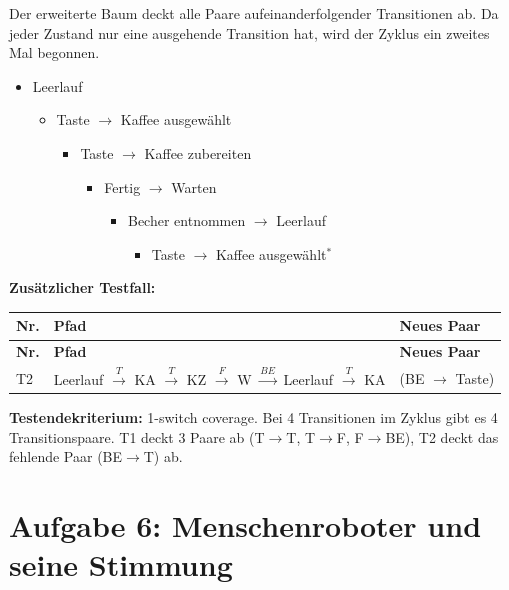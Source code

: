 \documentclass[
	fontsize=12pt,          %
	paper=a4,               %
	numbers=noenddot,       %
	listof=totoc,           %
	listof=entryprefix,     %
	listof=nochaptergap,    %
	bibliography=totoc,     %
	parskip=half,           %
	openany                 %
]{scrbook}
\begin{document}
Der erweiterte Baum deckt alle Paare aufeinanderfolgender Transitionen ab.
Da jeder Zustand nur eine ausgehende Transition hat, wird der Zyklus ein zweites Mal begonnen.

\begin{itemize}
	\item Leerlauf
	\begin{itemize}
		\item Taste $\rightarrow$ Kaffee ausgewählt
		\begin{itemize}
			\item Taste $\rightarrow$ Kaffee zubereiten
			\begin{itemize}
				\item Fertig $\rightarrow$ Warten
				\begin{itemize}
					\item Becher entnommen $\rightarrow$ Leerlauf
					\begin{itemize}
						\item Taste $\rightarrow$ Kaffee ausgewählt$^*$
					\end{itemize}
				\end{itemize}
			\end{itemize}
		\end{itemize}
	\end{itemize}
\end{itemize}

\textbf{Zusätzlicher Testfall:}

\begin{longtable}{| p{0.5cm} | p{8.0cm} | p{3.5cm} |}
	\hline
	\textbf{Nr.} & \textbf{Pfad} & \textbf{Neues Paar} \\ \hline
	\endfirsthead
	\hline
	\textbf{Nr.} & \textbf{Pfad} & \textbf{Neues Paar} \\ \hline
	\endhead
	\hline
	\endfoot
	T2 & Leerlauf $\xrightarrow{T}$ KA $\xrightarrow{T}$ KZ $\xrightarrow{F}$ W $\xrightarrow{BE}$ Leerlauf $\xrightarrow{T}$ KA & (BE $\rightarrow$ Taste) \\ \hline
\end{longtable}

\textbf{Testendekriterium:} 1-switch coverage.
Bei 4 Transitionen im Zyklus gibt es 4 Transitionspaare.
T1 deckt 3 Paare ab (T$\rightarrow$T, T$\rightarrow$F, F$\rightarrow$BE), T2 deckt das fehlende Paar (BE$\rightarrow$T) ab.


\chapter*{Aufgabe 6: Menschenroboter und seine Stimmung}
\end{document}
